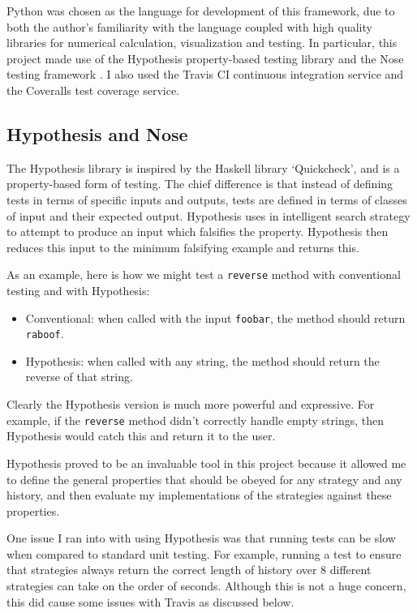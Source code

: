 \documentclass[a4paper,12pt]{article}
\begin{document}
Python was chosen as the language for development of this framework, due to both the author's familiarity with the language coupled with high quality libraries for numerical calculation, visualization and testing.
In particular, this project made use of the Hypothesis property-based testing library \cite{hypothesis} and the Nose testing framework \cite{nose}.
I also used the Travis CI continuous integration service and the Coveralls test coverage service.

\subsection{Hypothesis and Nose}
The Hypothesis library is inspired by the Haskell library `Quickcheck', and is a property-based form of testing.
The chief difference is that instead of defining tests in terms of specific inputs and outputs, tests are defined in terms of classes of input and their expected output.
Hypothesis uses in intelligent search strategy to attempt to produce an input which falsifies the property.
Hypothesis then reduces this input to the minimum falsifying example and returns this.

As an example, here is how we might test a \texttt{reverse} method with conventional testing and with Hypothesis:

\begin{itemize}
    \item Conventional: when called with the input \texttt{foobar}, the method should return \texttt{raboof}.
    \item Hypothesis: when called with any string, the method should return the reverse of that string.
\end{itemize}

Clearly the Hypothesis version is much more powerful and expressive.
For example, if the \texttt{reverse} method didn't correctly handle empty strings, then Hypothesis would catch this and return it to the user.

Hypothesis proved to be an invaluable tool in this project because it allowed me to define the general properties that should be obeyed for any strategy and any history, and then evaluate my implementations of the strategies against these properties.

One issue I ran into with using Hypothesis was that running tests can be slow when compared to standard unit testing.
For example, running a test to ensure that strategies always return the correct length of history over 8 different strategies can take on the order of seconds.
Although this is not a huge concern, this did cause some issues with Travis as discussed below.
\end{document}
